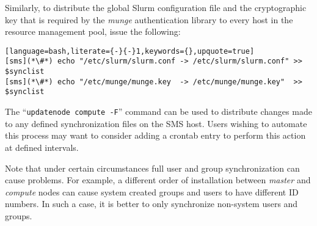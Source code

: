 \noindent Similarly, to distribute the global Slurm configuration file and the
cryptographic key that is required by the {\em munge} authentication library to
every host in the resource management pool, issue the following:

\begin{lstlisting}[language=bash,literate={-}{-}1,keywords={},upquote=true]
[sms](*\#*) echo "/etc/slurm/slurm.conf -> /etc/slurm/slurm.conf" >> $synclist
[sms](*\#*) echo "/etc/munge/munge.key  -> /etc/munge/munge.key"  >> $synclist
\end{lstlisting}

\begin{center}
\begin{tcolorbox}[]
\small
The ``\texttt{updatenode compute -F}'' command can be used to distribute changes made to any
defined synchronization files on the SMS host. Users wishing to automate this process may
want to consider adding a crontab entry to perform this action at defined intervals.

Note that under certain circumstances full user and group synchronization can 
cause problems. For example, a different order of installation between {\em
master} and {\em compute} nodes can cause system created groups and users to have
different ID numbers. In such a case, it is better to only synchronize
non-system users and groups.  
\fi
\end{tcolorbox}
\end{center}
